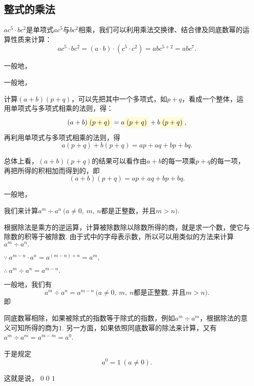 \documentclass[UTF8,fontset=macnew]{book} %
\newcommand{\mathcolorbox}[2]{\colorbox{#1}{$\displaystyle #2$}}
\begin{document}
			\subsection{整式的乘法}
				$ac^5\cdot bc^2$是单项式$ac^5$与$bc^2$相乘，我们可以利用乘法交换律、结合律及同底数幂的运算性质来计算：
			$$ac^5\cdot bc^2 = (a\cdot b)\cdot (c^5\cdot c^2)=abc^{5+2}=abc^7.$$
			
				一般地，\textcolor[RGB]{4,165,218}{}
				
				一般地，\textcolor[RGB]{4,165,218}{}
				
				计算$(a+b)(p+q)$，可以先把其中一个多项式，如$p+q$，看成一个整体，运用单项式与多项式相乘的法则，得：
			$$(a+b)\mathcolorbox{hlcolor}{(p+q)}=a\mathcolorbox{hlcolor}{(p+q)}+b\mathcolorbox{hlcolor}{(p+q)},$$
			再利用单项式与多项式相乘的法则，得
			$$a(p+q)+b(p+q)=ap+aq+bp+bq.$$
			
				总体上看，$(a+b)(p+q)$的结果可以看作由$a+b$的每一项乘$p+q$的每一项，再把所得的积相加而得到的，即
			$$(a+b)(p+q)=ap+aq+bp+bq.$$
			
				一般地，\textcolor[RGB]{4,165,218}{}
				
				我们来计算$a^m{\div} a^n\  \text{($a\ne 0,\ m,\ n$都是正整数，并且$m> n$)} .$
				
				根据除法是乘方的逆运算，计算被除数除以除数所得的商，就是求一个数，使它与除数的积等于被除数. 由于式中的字母表示数，所以可以用类似的方法来计算$a^m{\div} a^n.$
				
				$\because \ a^{m-n}\cdot a^n =a^{(m-n)+n}=a^m,$
				
				$\therefore \ a^m{\div} a^n=a^{m-n}.$
				
				一般地，我们有
			$$\boxed{a^m{\div} a^n=a^{m-n}\ \text{($a\ne 0,\ m,\ n$都是正整数, 并且$m> n$)} .} $$
			即\textcolor[RGB]{4,165,218}{}
			
				同底数幂相除，如果被除式的指数等于除式的指数，例如$a^m{\div} a^m$，根据除法的意义可知所得的商为$1$. 另一方面，如果依照同底数幂的除法来计算，又有$a^m\div a^m=a^{m-m}=a^0$.
				
				于是规定
			$$\boxed{a^0=1\ (a\ne 0).} $$
			
				这就是说，\textcolor[RGB]{4,165,218}{ $0$  $0$  $1$}
				
\end{document}
